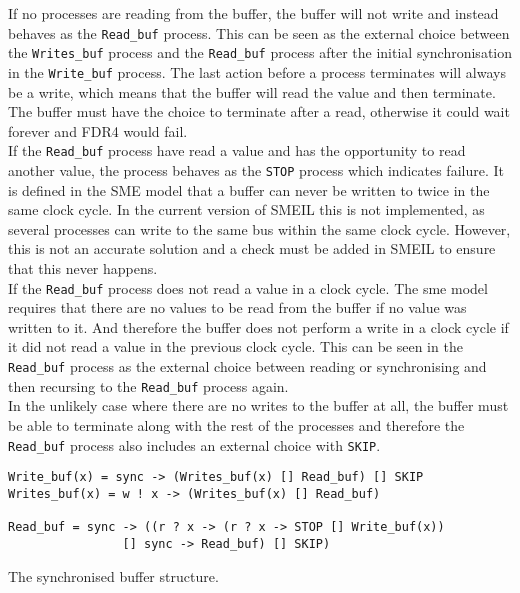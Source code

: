 If no processes are reading from the buffer, the buffer will not write and instead behaves as the \texttt{Read\_buf} process. This can be seen as the external choice between the \texttt{Writes\_buf} process and the \texttt{Read\_buf} process after the initial synchronisation in the \texttt{Write\_buf} process.
The last action before a process terminates will always be a write, which means that the buffer will read the value and then terminate. The buffer must have the choice to terminate after a read, otherwise it could wait forever and FDR4 would fail. \\

If the \texttt{Read\_buf} process have read a value and has the opportunity to read another value, the process behaves as the \texttt{STOP} process which indicates failure. It is defined in the SME model that a buffer can never be written to twice in the same clock cycle. In the current version of SMEIL this is not implemented, as several processes can write to the same bus within the same clock cycle. However, this is not an accurate solution and a check must be added in SMEIL to ensure that this never happens.\\

If the \texttt{Read\_buf} process does not read a value in a clock cycle.
The sme model requires that there are no values to be read from the buffer if no value was written to it. And therefore the buffer does not perform a write in a clock cycle if it did not read a value in the previous clock cycle. This can be seen in the \texttt{Read\_buf} process as the external choice between reading or synchronising and then recursing to the \texttt{Read\_buf} process again.\\

In the unlikely case where there are no writes to the buffer at all, the buffer must be able to terminate along with the rest of the processes and therefore the \texttt{Read\_buf} process also includes an external choice with \texttt{SKIP}.

\begin{listing}
\begin{verbatim}
Write_buf(x) = sync -> (Writes_buf(x) [] Read_buf) [] SKIP
Writes_buf(x) = w ! x -> (Writes_buf(x) [] Read_buf)

Read_buf = sync -> ((r ? x -> (r ? x -> STOP [] Write_buf(x))
                [] sync -> Read_buf) [] SKIP)
\end{verbatim}
\caption{The synchronised buffer structure.}
\label{lst:buffer}
\end{listing}

